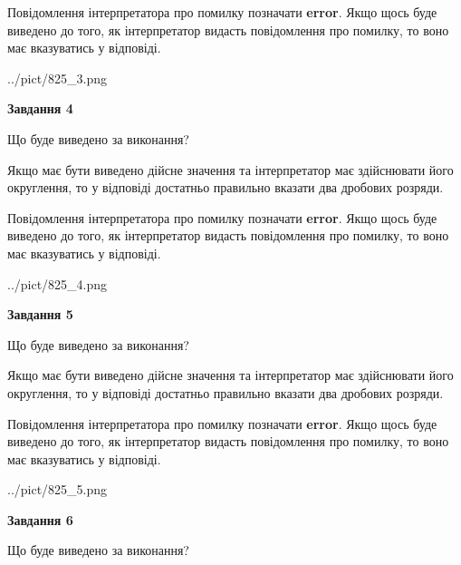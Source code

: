 \documentclass[12pt, ukrainian]{article}
\begin{document}
{\begin {Large}
Повідомлення інтерпретатора про помилку позначати \textbf{error}.
Якщо щось буде виведено до того, як інтерпретатор видасть повідомлення про помилку, 
то воно має вказуватись у відповіді. \par

\begin{center}
	{../pict/825_3.png}
\end{center}
\newpage

{\begin {center}\textbf{Завдання 4}\end {center}}\par
Що буде виведено за виконання? \par

Якщо має бути виведено дійсне значення та інтерпретатор має здійснювати його округлення, 
то у відповіді достатньо правильно вказати два дробових розряди.

Повідомлення інтерпретатора про помилку позначати \textbf{error}.
Якщо щось буде виведено до того, як інтерпретатор видасть повідомлення про помилку, 
то воно має вказуватись у відповіді. \par

\begin{center}
	{../pict/825_4.png}
\end{center}
\newpage

{\begin {center}\textbf{Завдання 5}\end {center}}\par
Що буде виведено за виконання? \par

Якщо має бути виведено дійсне значення та інтерпретатор має здійснювати його округлення, 
то у відповіді достатньо правильно вказати два дробових розряди.

Повідомлення інтерпретатора про помилку позначати \textbf{error}.
Якщо щось буде виведено до того, як інтерпретатор видасть повідомлення про помилку, 
то воно має вказуватись у відповіді. \par

\begin{center}
	{../pict/825_5.png}
\end{center}
\newpage

{\begin {center}\textbf{Завдання 6}\end {center}}\par
Що буде виведено за виконання? \par


\end{Large}}
\end{document}
